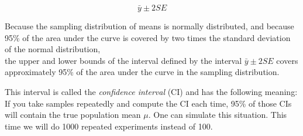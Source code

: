 \documentclass[12pt,]{krantz}
\newenvironment{Shaded}{\begin{snugshade}}{\end{snugshade}}
\newcommand{\CommentTok}[1]{\textcolor[rgb]{0.56,0.35,0.01}{\textit{#1}}}
\newcommand{\ControlFlowTok}[1]{\textcolor[rgb]{0.13,0.29,0.53}{\textbf{#1}}}
\newcommand{\DataTypeTok}[1]{\textcolor[rgb]{0.13,0.29,0.53}{#1}}
\newcommand{\DecValTok}[1]{\textcolor[rgb]{0.00,0.00,0.81}{#1}}
\newcommand{\KeywordTok}[1]{\textcolor[rgb]{0.13,0.29,0.53}{\textbf{#1}}}
\newcommand{\NormalTok}[1]{#1}
\newcommand{\OperatorTok}[1]{\textcolor[rgb]{0.81,0.36,0.00}{\textbf{#1}}}
\newcommand{\OtherTok}[1]{\textcolor[rgb]{0.56,0.35,0.01}{#1}}
\newcommand{\StringTok}[1]{\textcolor[rgb]{0.31,0.60,0.02}{#1}}
\begin{document}
\begin{equation}
\bar{y} \pm 2 SE
\end{equation}

Because the sampling distribution of means is normally distributed, and because 95\% of the area under the curve is covered by two times the standard deviation of the normal distribution,\\
the upper and lower bounds of the interval defined by the interval \(\bar{y} \pm 2 SE\) covers approximately 95\% of the area under the curve in the sampling distribution.

This interval is called the \emph{confidence interval} (CI) and has the following meaning: If you take samples repeatedly and compute the CI each time, 95\% of those CIs will contain the true population mean \(\mu\). One can simulate this situation. This time we will do 1000 repeated experiments instead of 100.

\begin{Shaded}
\end{Shaded}
\end{document}
